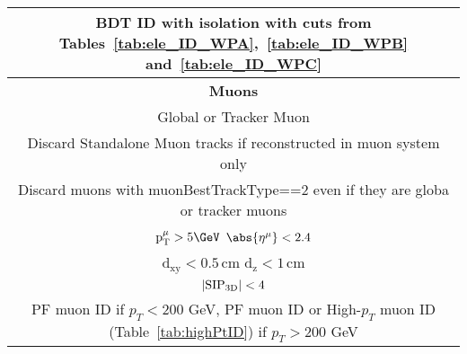 \begin{table}[H]
\begin{tabular}{|c|c|}
                \multicolumn{2}{|c|}{BDT ID with isolation with cuts from Tables~\ref{tab:ele_ID_WPA},~\ref{tab:ele_ID_WPB} and~\ref{tab:ele_ID_WPC} }    \\        
                \hline \hline
		\multicolumn{2}{|c|}{\textbf{Muons}}  \\ \hline
                \multicolumn{2}{|c|}{Global or Tracker Muon} \\
                \multicolumn{2}{|c|}{Discard Standalone Muon tracks if reconstructed in muon system only} \\
                \multicolumn{2}{|c|}{Discard muons with muonBestTrackType==2 even if they are globa or tracker muons} \\
		\multicolumn{2}{|c|}{$\mathrm{p_T^{\mu}} > 5 \GeV$ \hspace{0.5cm} $\abs{\eta^{\mu}} < 2.4$}                                                                                                                                       \\
		\multicolumn{2}{|c|}{$\mathrm{d_{xy}} < 0.5 \, \mathrm{cm}$ \hspace{0.5cm} $\mathrm{d_{z}} < 1 \, \mathrm{cm}$}                                                                                                                           \\
		\multicolumn{2}{|c|}{$| {\rm SIP_{3D}} | < 4$  }                                                                                                                                                                                   \\
		\multicolumn{2}{|c|}{PF muon ID if $p_T<200$  GeV, PF muon ID or High-$p_T$ muon ID (Table~\ref{tab:highPtID}) if $p_T>200$ GeV}                                                                                                                                                 \\

\end{tabular}
\end{table}
